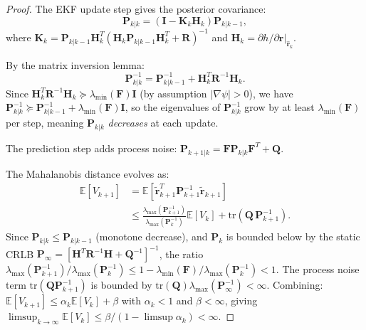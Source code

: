 \documentclass[aps,prd,twocolumn,superscriptaddress,nofootinbib]{revtex4-2}
\begin{document}
\begin{proof}
The EKF update step gives the posterior covariance:
\begin{equation}
  \mathbf{P}_{k|k} = (\mathbf{I} - \mathbf{K}_k \mathbf{H}_k)\mathbf{P}_{k|k-1},
\end{equation}
where $\mathbf{K}_k = \mathbf{P}_{k|k-1}\mathbf{H}_k^T(\mathbf{H}_k
\mathbf{P}_{k|k-1}\mathbf{H}_k^T + \mathbf{R})^{-1}$ and
$\mathbf{H}_k = \partial h/\partial\mathbf{r}|_{\hat{\mathbf{r}}_k}$.

By the matrix inversion lemma:
\begin{equation}
  \mathbf{P}_{k|k}^{-1} = \mathbf{P}_{k|k-1}^{-1} + \mathbf{H}_k^T\mathbf{R}^{-1}\mathbf{H}_k.
  \label{eq:pii-update}
\end{equation}
Since $\mathbf{H}_k^T\mathbf{R}^{-1}\mathbf{H}_k \succeq
\lambda_{\min}(\mathbf{F})\mathbf{I}$ (by assumption $|\nabla\psi|>0$),
we have $\mathbf{P}_{k|k}^{-1} \succeq \mathbf{P}_{k|k-1}^{-1} +
\lambda_{\min}(\mathbf{F})\mathbf{I}$, so the eigenvalues of
$\mathbf{P}_{k|k}^{-1}$ grow by at least $\lambda_{\min}(\mathbf{F})$
per step, meaning $\mathbf{P}_{k|k}$ \emph{decreases} at each update.

The prediction step adds process noise:
$\mathbf{P}_{k+1|k} = \mathbf{F}\mathbf{P}_{k|k}\mathbf{F}^T + \mathbf{Q}$.

The Mahalanobis distance evolves as:
\begin{align}
  \mathbb{E}[V_{k+1}] &= \mathbb{E}[\tilde{\mathbf{r}}_{k+1}^T
    \mathbf{P}_{k+1}^{-1} \tilde{\mathbf{r}}_{k+1}] \nonumber\\
  &\leq \frac{\lambda_{\max}(\mathbf{P}_{k+1}^{-1})}
             {\lambda_{\max}(\mathbf{P}_k^{-1})} \mathbb{E}[V_k]
  + \mathrm{tr}(\mathbf{Q}\,\mathbf{P}_{k+1}^{-1}).
  \label{eq:vk-bound}
\end{align}
Since $\mathbf{P}_{k|k} \leq \mathbf{P}_{k|k-1}$ (monotone decrease),
and $\mathbf{P}_k$ is bounded below by the static CRLB $\mathbf{P}_\infty
= [{\mathbf{H}^T\mathbf{R}^{-1}\mathbf{H} + \mathbf{Q}^{-1}}]^{-1}$,
the ratio $\lambda_{\max}(\mathbf{P}_{k+1}^{-1})/\lambda_{\max}(\mathbf{P}_k^{-1})
\leq 1 - \lambda_{\min}(\mathbf{F})/\lambda_{\max}(\mathbf{P}_k^{-1})
< 1$.  The process noise term $\mathrm{tr}(\mathbf{Q}\mathbf{P}_{k+1}^{-1})$
is bounded by $\mathrm{tr}(\mathbf{Q})\lambda_{\max}(\mathbf{P}_\infty^{-1})
< \infty$.  Combining: $\mathbb{E}[V_{k+1}] \leq \alpha_k \mathbb{E}[V_k]
+ \beta$ with $\alpha_k < 1$ and $\beta < \infty$, giving
$\limsup_{k\to\infty} \mathbb{E}[V_k] \leq \beta/(1 - \limsup \alpha_k) < \infty$.
\end{proof}
\end{document}
